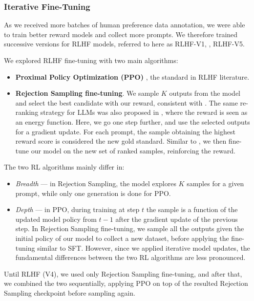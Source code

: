 \subsubsection{Iterative Fine-Tuning}
\label{subsec:rlhf_iter}

As we received more batches of human preference data annotation, we were able to train better reward models and collect more prompts. We therefore trained  successive versions for RLHF models, referred to here as RLHF-V1, \textellipsis,  RLHF-V5.

We explored RLHF fine-tuning with two main algorithms:

\begin{itemize}
    \item \textbf{Proximal Policy Optimization (PPO)} \citep{schulman2017proximal}, the standard in RLHF literature. 
    \item \textbf{Rejection Sampling fine-tuning}. We sample $K$ outputs from the model and select the best candidate with our reward, consistent with \cite{bai2022constitutional}. The same re-ranking strategy for LLMs was also proposed in \cite{deng2019residual}, where the reward is seen as an energy function. Here, we go one step further, and use the selected outputs for a gradient update. For each prompt, the sample obtaining the highest reward score is considered the new gold standard. Similar to \cite{pmlr-v119-scialom20a}, we then fine-tune our model on the new set of ranked samples, reinforcing the reward. 
\end{itemize}

The two RL algorithms mainly differ in:

\begin{itemize}
    \item \textit{Breadth} --- in Rejection Sampling, the model explores $K$ samples for a given prompt, while only one generation is done for PPO.
    \item \textit{Depth} --- in PPO, during training at step $t$ the sample is a function of the updated model policy from $t-1$ after the gradient update of the previous step. In Rejection Sampling fine-tuning, we sample all the outputs given the initial policy of our model to collect a new dataset, before applying the fine-tuning similar to SFT. However, since we applied iterative model updates, the fundamental differences between the two RL algorithms are less pronounced.
\end{itemize}

Until RLHF (V4), we used only Rejection Sampling fine-tuning, and after that, we combined the two sequentially, applying PPO on top of the resulted Rejection Sampling checkpoint before sampling again. 


